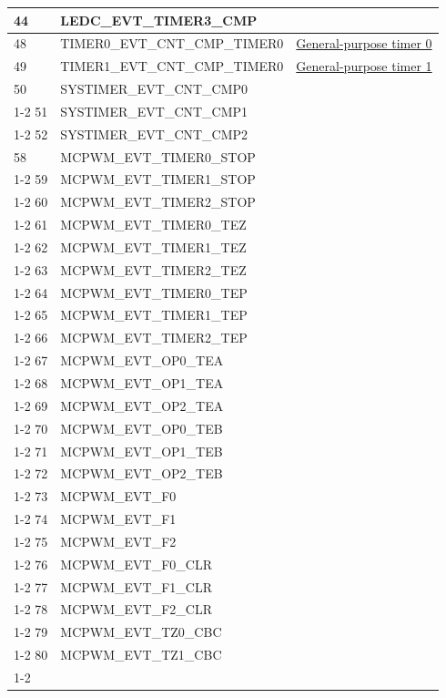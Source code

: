 \documentclass[main\_\_EN.tex]{subfiles}
\begin{document}
\begin{longtable}{ | l | l | l | }
44  & LEDC\_EVT\_TIMER3\_CMP    & \\ \hline
48  & TIMER0\_EVT\_CNT\_CMP\_TIMER0    & \hyperref[mod:timg]{General-purpose timer 0}   \\ \hline
49  & TIMER1\_EVT\_CNT\_CMP\_TIMER0    & \hyperref[mod:timg]{General-purpose timer 1}   \\ \hline
50  & SYSTIMER\_EVT\_CNT\_CMP0  & \nameref{mod:systimer}     \\ \cline{1-2}
51  & SYSTIMER\_EVT\_CNT\_CMP1  & \\ \cline{1-2}
52  & SYSTIMER\_EVT\_CNT\_CMP2  & \\ \hline
58  & MCPWM\_EVT\_TIMER0\_STOP  & \nameref{mod:mcpwm}\\ \cline{1-2}
59  & MCPWM\_EVT\_TIMER1\_STOP  & \\ \cline{1-2}
60  & MCPWM\_EVT\_TIMER2\_STOP  & \\ \cline{1-2}
61  & MCPWM\_EVT\_TIMER0\_TEZ   & \\ \cline{1-2}
62  & MCPWM\_EVT\_TIMER1\_TEZ   & \\ \cline{1-2}
63  & MCPWM\_EVT\_TIMER2\_TEZ   & \\ \cline{1-2}
64  & MCPWM\_EVT\_TIMER0\_TEP   & \\ \cline{1-2}
65  & MCPWM\_EVT\_TIMER1\_TEP   & \\ \cline{1-2}
66  & MCPWM\_EVT\_TIMER2\_TEP   & \\ \cline{1-2}
67  & MCPWM\_EVT\_OP0\_TEA & \\ \cline{1-2}
68  & MCPWM\_EVT\_OP1\_TEA & \\ \cline{1-2}
69  & MCPWM\_EVT\_OP2\_TEA & \\ \cline{1-2}
70  & MCPWM\_EVT\_OP0\_TEB & \\ \cline{1-2}
71  & MCPWM\_EVT\_OP1\_TEB & \\ \cline{1-2}
72  & MCPWM\_EVT\_OP2\_TEB & \\ \cline{1-2}
73  & MCPWM\_EVT\_F0     & \\ \cline{1-2}
74  & MCPWM\_EVT\_F1     & \\ \cline{1-2}
75  & MCPWM\_EVT\_F2     & \\ \cline{1-2}
76  & MCPWM\_EVT\_F0\_CLR  & \\ \cline{1-2}
77  & MCPWM\_EVT\_F1\_CLR  & \\ \cline{1-2}
78  & MCPWM\_EVT\_F2\_CLR  & \\ \cline{1-2}
79  & MCPWM\_EVT\_TZ0\_CBC & \\ \cline{1-2}
80  & MCPWM\_EVT\_TZ1\_CBC & \\ \cline{1-2}

\end{longtable}
\end{document}
